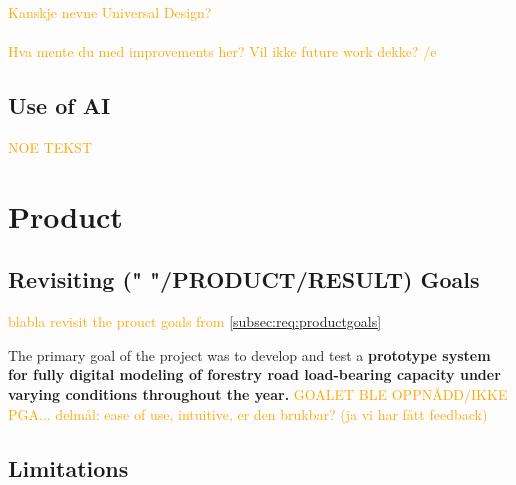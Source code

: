 \textcolor{orange}{Kanskje nevne Universal Design? \\ \\
Hva mente du med improvements her? Vil ikke future work dekke? /e}

\subsection{Use of AI}

\textcolor{orange}{NOE TEKST}

\section{Product}

\subsection{Revisiting (" "/PRODUCT/RESULT) Goals}

\textcolor{orange}{blabla revisit the prouct goals from \autoref{subsec:req:productgoals}}

\begin{comment}
    The primary goal of the project is to develop and test a \textbf{prototype system for fully digital modeling of forestry road load-bearing capacity under varying conditions throughout the year.} The solution will incorporate various geological and meteorological parameters, such as soil type and moisture, weather forecasts, and precipitation data, to generate an accurate classification of forest roads. This classification will be presented through an interactive map-based website. Furthermore, the system will prioritize ease of use, with an intuitive interface designed for transport managers, allowing them to make informed route choices based on real-time data and forecasts. 
\end{comment}

The primary goal of the project was to develop and test a \textbf{prototype system for fully digital modeling of forestry road load-bearing capacity under varying conditions throughout the year.} \textcolor{orange}{GOALET BLE OPPNÅDD/IKKE PGA... delmål: ease of use, intuitive, er den brukbar? (ja vi har fått feedback)}

\subsection{Limitations}


